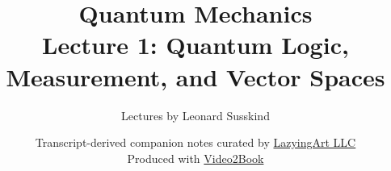 \documentclass[11pt,oneside]{book}
\begin{document}
\hypersetup{pageanchor=false}
\frontmatter
\title{Quantum Mechanics\\[0.45em]
\large Lecture 1: Quantum Logic, Measurement, and Vector Spaces}
\author{Lectures by Leonard Susskind}
\date{Transcript-derived companion notes curated by
\href{https://lazying.art}{LazyingArt LLC}\\[0.35em]
\small Produced with
\href{https://github.com/lachlanchen/Video2Book}{Video2Book}}
\maketitle
\hypersetup{pageanchor=true}
\mainmatter

\end{document}
